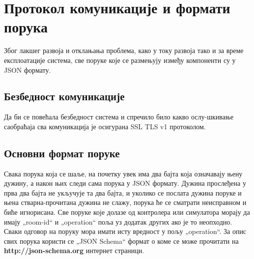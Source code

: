 \documentclass[a4paper, 12pt, diplomski]{etfcyr}
\def\quote#1{„#1“}
\begin{document}
		\newpage

		\section{Протокол комуникације и формати порука}
			\begin{justify}
				Због лакшег развоја и отклањања проблема, како у току развоја тако и за време експлоатације система, све поруке које се размењују између компоненти су у JSON формату.
			\end{justify}

			\subsection{Безбедност комуникације}
				\begin{justify}
					Да би се повећала безбедност система и спречило било какво ослу-шкивање саобраћаја сва комуникација је осигурана SSL TLS v1 протоколом.
				\end{justify}
			
			\subsection{Основни формат поруке}
				\begin{justify}
					Свака порука која се шаље, на почетку увек има два бајта која означавају њену дужину, а након њих следи сама порука у JSON формату. Дужина прослеђена у прва два бајта не укључује та два бајта, и уколико се послата дужина поруке и њена стварна-прочитана дужина не слажу, порука ће се сматрати неисправном и биће игнорисана. Све поруке које долазе од контролера или симулатора морају да имају \quote{room-id} и \quote{operation} поља уз додатак других ако је то неопходно. Сваки одговор на поруку мора имати исту вредност у пољу \quote{operation}.
					За опис свих порука користи се \quote{JSON Schema} формат о коме се може прочитати на \textbf{http://json-schema.org} интернет страници.
				\end{justify}

			\newpage
\end{document}
